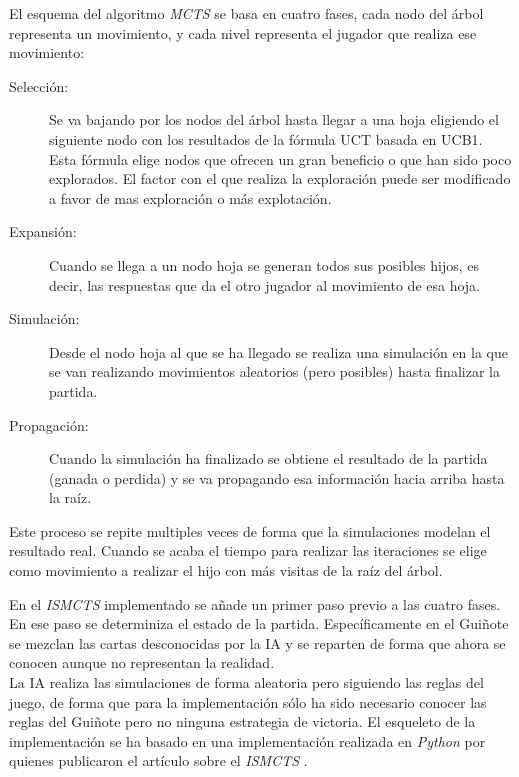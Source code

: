 El esquema del algoritmo \textit{MCTS} se basa en cuatro fases, cada nodo del árbol representa un movimiento, y cada nivel representa el jugador que realiza ese movimiento:
\begin{description}
  \item[Selección: ] Se va bajando por los nodos del árbol hasta llegar a una hoja eligiendo el siguiente nodo con los resultados de la fórmula UCT basada en UCB1. Esta fórmula elige nodos que ofrecen un gran beneficio o que han sido poco explorados. El factor con el que realiza la exploración puede ser modificado a favor de mas exploración o más explotación. 
  \item[Expansión: ] Cuando se llega a un nodo hoja se generan todos sus posibles hijos, es decir, las respuestas que da el otro jugador al movimiento de esa hoja.
  \item[Simulación: ] Desde el nodo hoja al que se ha llegado se realiza una simulación en la que se van realizando movimientos aleatorios (pero posibles) hasta finalizar la partida.
  \item[Propagación: ] Cuando la simulación ha finalizado se obtiene el resultado de la partida (ganada o perdida) y se va propagando esa información hacia arriba hasta la raíz.
\end{description}

Este proceso se repite multiples veces de forma que la simulaciones modelan el resultado real. Cuando se acaba el tiempo para realizar las iteraciones se elige como movimiento a realizar el hijo con más visitas de la raíz del árbol.

En el \textit{ISMCTS} implementado se añade un primer paso previo a las cuatro fases. En ese paso se determiniza el estado de la partida. Específicamente en el Guiñote se mezclan las cartas desconocidas por la IA y se reparten de forma que ahora se conocen aunque no representan la realidad.\\

La IA realiza las simulaciones de forma aleatoria pero siguiendo las reglas del juego, de forma que para la implementación sólo ha sido necesario conocer las reglas del Guiñote pero no ninguna estrategia de victoria. El esqueleto de la implementación se ha basado en una implementación realizada en \textit{Python} por quienes publicaron el artículo sobre el \textit{ISMCTS} \cite{ismctspy}.\\

